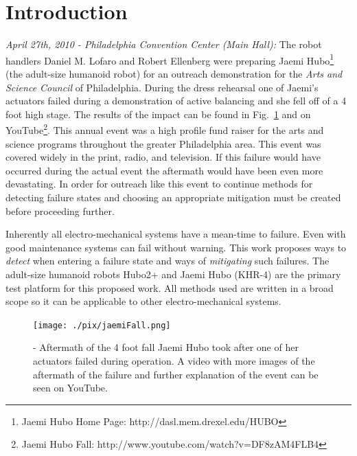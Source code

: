 \section{Introduction}

\textit{April 27th, 2010 - Philadelphia Convention Center (Main Hall):}  The robot handlers Daniel M. Lofaro 
and Robert Ellenberg were preparing Jaemi Hubo\footnote{Jaemi Hubo Home Page: http://dasl.mem.drexel.edu/HUBO} (the adult-size humanoid robot) for an outreach demonstration for the 
\textit{Arts and Science Council} of Philadelphia.  During the dress rehearsal one of Jaemi's actuators failed 
during a demonstration of active balancing and she fell off of a 4 foot high stage.  The results of the impact 
can be found in Fig.~\ref{fig:fall} and on YouTube\footnote{Jaemi Hubo Fall: http://www.youtube.com/watch?v=DF8zAM4FLB4\label{link:fall}}.  
This annual event was a high profile fund raiser for the arts and science programs throughout the greater Philadelphia area.  This event was covered widely in the print, radio, and television.  If this failure would have occurred during the actual event the 
aftermath would have been even more devastating.  In order for outreach like this event to continue methods 
for detecting failure states and choosing an appropriate mitigation must be created before proceeding further.

Inherently all electro-mechanical systems have a mean-time to failure.  Even with good maintenance systems can fail without warning.  This work proposes ways to \textit{detect} when entering a failure state and ways of \textit{mitigating} such failures.  The adult-size humanoid robots Hubo2+ and Jaemi Hubo (KHR-4) are the primary test platform for this proposed work.  All methods used are written in a broad scope so it can be applicable to other electro-mechanical systems.

\begin{figure}[t]
  \centering
\texttt{[image: ./pix/jaemiFall.png]}
  \caption{-  Aftermath of the 4 foot fall Jaemi Hubo took after one of her actuators failed during operation.  A video with more images of the aftermath of the failure and further explanation of the event can be seen on YouTube.}%
  \label{fig:fall}
\end{figure}  

